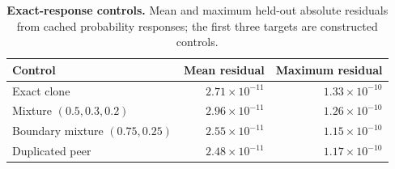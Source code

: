 \begin{table}[t]
\caption{\textbf{Exact-response controls.} Mean and maximum held-out absolute residuals from cached probability responses; the first three targets are constructed controls.}
\label{tab:controls}
\centering\small
\begin{tabular}{lrr}
\toprule
Control & Mean residual & Maximum residual\\
\midrule
Exact clone & $2.71\times10^{-11}$ & $1.33\times10^{-10}$\\
Mixture $(0.5,0.3,0.2)$ & $2.96\times10^{-11}$ & $1.26\times10^{-10}$\\
Boundary mixture $(0.75,0.25)$ & $2.55\times10^{-11}$ & $1.15\times10^{-10}$\\
Duplicated peer & $2.48\times10^{-11}$ & $1.17\times10^{-10}$\\
\bottomrule
\end{tabular}
\end{table}
